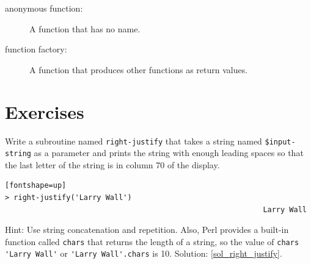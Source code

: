 \begin{description}
\item[anonymous function:] A function that has no name.

\item[function factory:] A function that produces other functions as return values.

\end{description}


\section{Exercises}

\begin{exercise}
\label{right_justify}

Write a subroutine named \verb"right-justify" that takes a string
named {\tt \$input-string} as a parameter and prints the 
string with enough leading spaces so that the last letter 
of the string is in column 70 of the display.

\begin{verbatim}[fontshape=up]
> right-justify('Larry Wall')
                                                           Larry Wall
\end{verbatim}

Hint: Use string concatenation and repetition.  Also,
Perl provides a built-in function called {\tt chars} that
returns the length of a string, so the value of 
\verb"chars 'Larry Wall'" or \verb"'Larry Wall'.chars" is 10.
Solution: \ref{sol_right_justify}.

\end{exercise}


